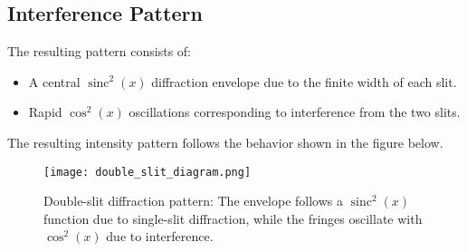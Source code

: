 \documentclass[11pt]{article}
\begin{document}
\subsection{Interference Pattern}
The resulting pattern consists of:
\begin{itemize}
    \item A central \(\operatorname{sinc}^2(x)\) diffraction envelope due to the finite width of each slit.
    \item Rapid \(\cos^2(x)\) oscillations corresponding to interference from the two slits.
\end{itemize}
The resulting intensity pattern follows the behavior shown in the figure below.

\begin{figure}[h]
    \centering
    \texttt{[image: double\_slit\_diagram.png]}
    \caption{Double-slit diffraction pattern: The envelope follows a \(\operatorname{sinc}^2(x)\) function due to single-slit diffraction, while the fringes oscillate with \(\cos^2(x)\) due to interference.}
\end{figure}
\end{document}
